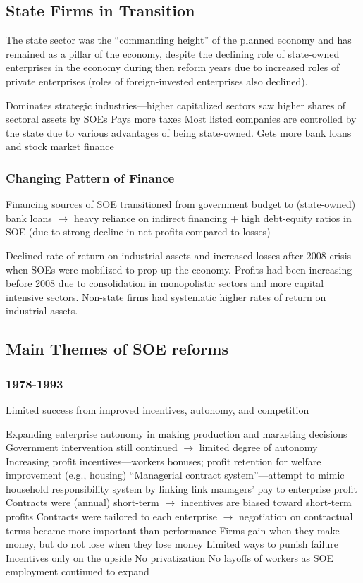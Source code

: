 \documentclass[11pt]{article}
\theoremstyle{definition}
\theoremstyle{remark}
\begin{document}
\subsection{State Firms in Transition}
The state sector was the ``commanding height'' of the planned economy and has remained as a pillar of the economy, despite the declining role of state-owned enterprises in the economy during then reform years due to increased roles of private enterprises (roles of foreign-invested enterprises also declined).
\begin{outline}[enumerate]
\1 Dominates strategic industries---higher capitalized sectors saw higher shares of sectoral assets by SOEs
\1 Pays more taxes
\1 Most listed companies are controlled by the state due to various advantages of being state-owned.
	\2 Gets more bank loans and stock market finance
\end{outline}

\subsubsection{Changing Pattern of Finance}
Financing sources of SOE transitioned from government budget to (state-owned) bank loans $\to$ heavy reliance on indirect financing + high debt-equity ratios in SOE (due to strong decline in net profits compared to losses)
\begin{outline}[enumerate]
\1 Declined rate of return on industrial assets and increased losses after 2008 crisis when SOEs were mobilized to prop up the economy.
	\2 Profits had been increasing before 2008 due to consolidation in monopolistic sectors and more capital intensive sectors.
	\2 Non-state firms had systematic higher rates of return on industrial assets.
\end{outline}

\subsection{Main Themes of SOE reforms}
\subsubsection{1978-1993}
Limited success from improved incentives, autonomy, and competition
\begin{outline}[enumerate]
\1 Expanding enterprise autonomy in making production and marketing decisions
	\2 Government intervention still continued $\to$ limited degree of autonomy
\1 Increasing profit incentives---workers bonuses; profit retention for welfare improvement (e.g., housing)
\1 ``Managerial contract system''---attempt to mimic household responsibility system by linking link managers' pay to enterprise profit
	\2 Contracts were (annual) short-term $\to$ incentives are biased toward short-term profits
	\2 Contracts were tailored to each enterprise $\to$ negotiation on contractual terms became more important than performance
	\2 Firms gain when they make money, but do not lose when they lose money
		\3 Limited ways to punish failure
		\3 Incentives only on the upside
\1 No privatization
\1 No layoffs of workers as SOE employment continued to expand
\end{outline}
\end{document}
